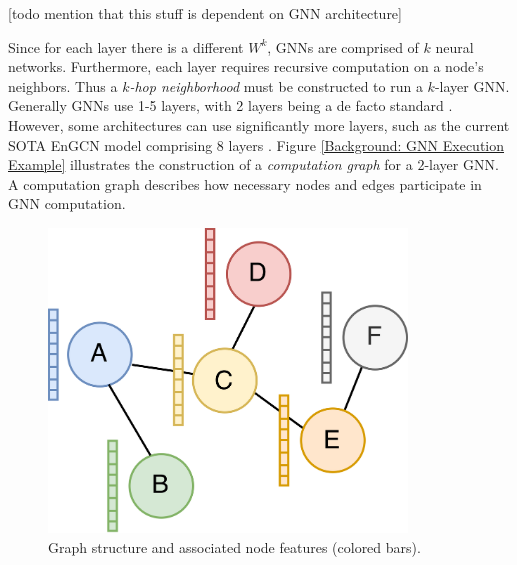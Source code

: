 [todo mention that this stuff is dependent on GNN architecture]

Since for each layer there is a different $W^k$, GNNs are comprised of $k$ neural networks. Furthermore, each layer requires recursive computation on a node's neighbors. Thus a \textit{$k$-hop neighborhood} must be constructed to run a $k$-layer GNN.
Generally GNNs use 1-5 layers, with 2 layers being a de facto standard \cite{Survey_First_2022}. However, some architectures can use significantly more layers, such as the current SOTA EnGCN model comprising 8 layers \cite{EnGCN_2023}.
Figure \ref{Background: GNN Execution Example} illustrates the construction of a \textit{computation graph} for a $2$-layer GNN. A computation graph describes how necessary nodes and edges participate in GNN computation.


\begin{figure}[h!]
    \begin{minipage}[c]{0.5\textwidth}
        \centering
        \includegraphics[width=0.85\textwidth]{diagrams/group_meeting_gnn-Graph structure.png}    
        \caption{Graph structure and associated node features (colored bars).}
    \end{minipage}
    \hfill
    \begin{minipage}[c]{0.45\textwidth}
        \centering

\end{minipage}
\end{figure}
